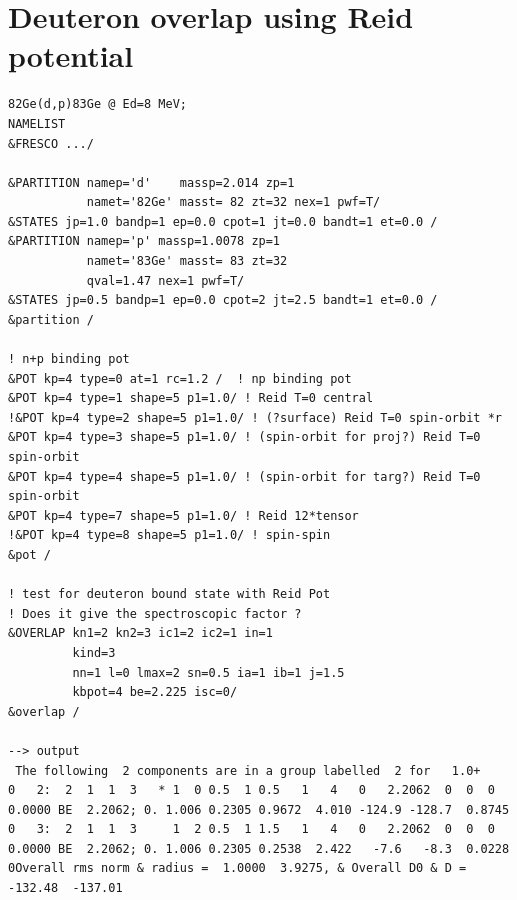 \documentclass[11pt]{book}
\begin{document}
\section{Deuteron overlap using Reid potential} 
\begin{small} \begin{lstlisting}[frame=single]
82Ge(d,p)83Ge @ Ed=8 MeV;
NAMELIST
&FRESCO .../

&PARTITION namep='d'    massp=2.014 zp=1 
           namet='82Ge' masst= 82 zt=32 nex=1 pwf=T/
&STATES jp=1.0 bandp=1 ep=0.0 cpot=1 jt=0.0 bandt=1 et=0.0 /
&PARTITION namep='p' massp=1.0078 zp=1 
           namet='83Ge' masst= 83 zt=32 
           qval=1.47 nex=1 pwf=T/
&STATES jp=0.5 bandp=1 ep=0.0 cpot=2 jt=2.5 bandt=1 et=0.0 /
&partition /

! n+p binding pot
&POT kp=4 type=0 at=1 rc=1.2 /  ! np binding pot
&POT kp=4 type=1 shape=5 p1=1.0/ ! Reid T=0 central
!&POT kp=4 type=2 shape=5 p1=1.0/ ! (?surface) Reid T=0 spin-orbit *r
&POT kp=4 type=3 shape=5 p1=1.0/ ! (spin-orbit for proj?) Reid T=0 spin-orbit
&POT kp=4 type=4 shape=5 p1=1.0/ ! (spin-orbit for targ?) Reid T=0 spin-orbit
&POT kp=4 type=7 shape=5 p1=1.0/ ! Reid 12*tensor
!&POT kp=4 type=8 shape=5 p1=1.0/ ! spin-spin 
&pot /

! test for deuteron bound state with Reid Pot
! Does it give the spectroscopic factor ? 
&OVERLAP kn1=2 kn2=3 ic1=2 ic2=1 in=1
         kind=3 
         nn=1 l=0 lmax=2 sn=0.5 ia=1 ib=1 j=1.5
         kbpot=4 be=2.225 isc=0/ 
&overlap /

--> output
 The following  2 components are in a group labelled  2 for   1.0+
0   2:  2  1  1  3   * 1  0 0.5  1 0.5   1   4   0   2.2062  0  0  0 0.0000 BE  2.2062; 0. 1.006 0.2305 0.9672  4.010 -124.9 -128.7  0.8745
0   3:  2  1  1  3     1  2 0.5  1 1.5   1   4   0   2.2062  0  0  0 0.0000 BE  2.2062; 0. 1.006 0.2305 0.2538  2.422   -7.6   -8.3  0.0228
0Overall rms norm & radius =  1.0000  3.9275, & Overall D0 & D =  -132.48  -137.01

\end{lstlisting}\end{small}
\end{document}
